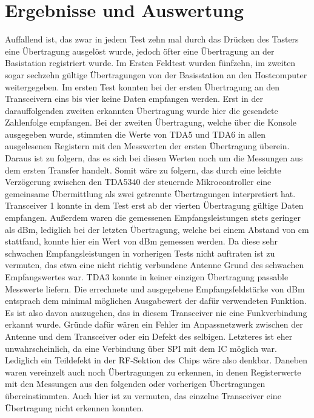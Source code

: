\section{Ergebnisse und Auswertung}
Auffallend ist, das zwar in jedem Test zehn mal durch das Drücken des Tasters eine Übertragung ausgelöst wurde, jedoch öfter eine Übertragung an der Basistation registriert wurde. Im Ersten Feldtest wurden fünfzehn, im zweiten sogar sechzehn gültige Übertragungen von der Basisstation an den Hostcomputer weitergegeben. 
Im ersten Test konnten bei der ersten Übertragung an den Transceivern eins bis vier keine Daten empfangen  werden. Erst in der darauffolgenden zweiten erkannten Übertragung wurde hier die gesendete Zahlenfolge empfangen. Bei der zweiten Übertragung, welche über die Konsole ausgegeben wurde, stimmten die Werte von TDA5 und TDA6 in allen ausgelesenen Registern mit den Messwerten der ersten Übertragung überein.  Daraus ist zu folgern, das es sich bei diesen Werten noch um die Messungen aus dem ersten Transfer handelt. Somit wäre zu folgern, das durch eine leichte Verzögerung zwischen den TDA5340 der steuernde Mikrocontroller eine gemeinsame Übermittlung als zwei getrennte Übertragungen interpretiert hat.
Transceiver 1 konnte in dem Test erst ab der vierten Übertragung gültige Daten empfangen. Außerdem waren die gemessenen Empfangsleistungen stets geringer als \unit[-100]{dBm}, lediglich  bei der letzten Übertragung, welche bei einem Abstand von \unit[30]{cm} stattfand, konnte hier ein Wert von \unit[-97]{dBm} gemessen werden. Da diese  sehr schwachen Empfangsleistungen in vorherigen Tests nicht auftraten ist zu vermuten, das etwa eine nicht richtig verbundene Antenne  Grund des schwachen Empfangswertes war.
TDA3 konnte in keiner einzigen Übertragung passable Messwerte liefern. Die errechnete und ausgegebene Empfangsfeldstärke von \unit[-114]{dBm} entsprach dem minimal möglichen Ausgabewert der dafür verwendeten Funktion. Es ist also davon auszugehen, das in diesem Transceiver nie eine Funkverbindung erkannt wurde. Gründe dafür wären ein Fehler im Anpassnetzwerk zwischen der Antenne und dem Transceiver oder ein Defekt des selbigen. Letzteres ist eher unwahrscheinlich, da eine Verbindung über \ac{SPI} mit dem \ac{IC} möglich war. Lediglich ein Teildefekt  in der RF-Sektion des Chips wäre also denkbar.
Daneben waren vereinzelt auch noch Übertragungen zu erkennen, in denen Registerwerte mit den Messungen aus den folgenden oder vorherigen Übertragungen übereinstimmten. Auch hier ist zu vermuten, das einzelne Transceiver eine Übertragung nicht erkennen konnten. 


